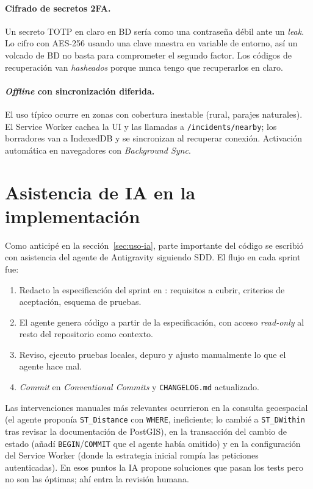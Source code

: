 \paragraph{Cifrado de secretos 2FA.}  Un secreto TOTP en claro en BD sería como una contraseña débil ante un \textit{leak}. Lo cifro con AES-256 usando una clave maestra en variable de entorno, así un volcado de BD no basta para comprometer el segundo factor. Los códigos de recuperación van \textit{hasheados} porque nunca tengo que recuperarlos en claro.

\paragraph{\textit{Offline} con sincronización diferida.}  El uso típico ocurre en zonas con cobertura inestable (rural, parajes naturales). El Service Worker cachea la UI y las llamadas a \texttt{/incidents/nearby}; los borradores van a IndexedDB y se sincronizan al recuperar conexión. Activación automática en navegadores con \textit{Background Sync}.


\section{Asistencia de IA en la implementación}
\label{sec:ia-implementacion}

Como anticipé en la sección~\ref{sec:uso-ia}, parte importante del código se escribió con asistencia del agente de Antigravity siguiendo SDD. El flujo en cada sprint fue:

\begin{enumerate}[leftmargin=1.2cm, itemsep=2pt]
  \item Redacto la especificación del sprint en : requisitos a cubrir, criterios de aceptación, esquema de pruebas.
  \item El agente genera código a partir de la especificación, con acceso \textit{read-only} al resto del repositorio como contexto.
  \item Reviso, ejecuto pruebas locales, depuro y ajusto manualmente lo que el agente hace mal.
  \item \textit{Commit} en \textit{Conventional Commits} y \texttt{CHANGELOG.md} actualizado.
\end{enumerate}

Las intervenciones manuales más relevantes ocurrieron en la consulta geoespacial (el agente proponía \texttt{ST\_Distance} con \texttt{WHERE}, ineficiente; lo cambié a \texttt{ST\_DWithin} tras revisar la documentación de PostGIS), en la transacción del cambio de estado (añadí \texttt{BEGIN}/\texttt{COMMIT} que el agente había omitido) y en la configuración del Service Worker (donde la estrategia inicial rompía las peticiones autenticadas). En esos puntos la IA propone soluciones que pasan los tests pero no son las óptimas; ahí entra la revisión humana.
